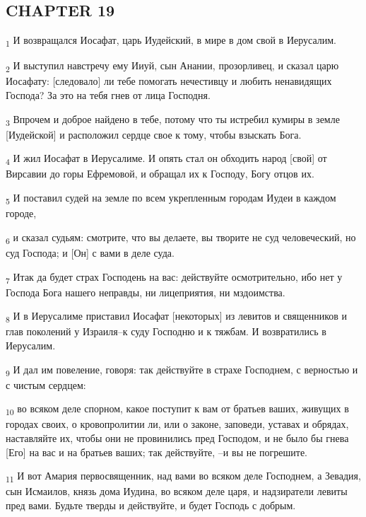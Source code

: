 \subsection{CHAPTER 19}
\begin{tcolorbox}
\textsubscript{1} И возвращался Иосафат, царь Иудейский, в мире в дом свой в Иерусалим.
\end{tcolorbox}
\begin{tcolorbox}
\textsubscript{2} И выступил навстречу ему Ииуй, сын Анании, прозорливец, и сказал царю Иосафату: [следовало] ли тебе помогать нечестивцу и любить ненавидящих Господа? За это на тебя гнев от лица Господня.
\end{tcolorbox}
\begin{tcolorbox}
\textsubscript{3} Впрочем и доброе найдено в тебе, потому что ты истребил кумиры в земле [Иудейской] и расположил сердце свое к тому, чтобы взыскать Бога.
\end{tcolorbox}
\begin{tcolorbox}
\textsubscript{4} И жил Иосафат в Иерусалиме. И опять стал он обходить народ [свой] от Вирсавии до горы Ефремовой, и обращал их к Господу, Богу отцов их.
\end{tcolorbox}
\begin{tcolorbox}
\textsubscript{5} И поставил судей на земле по всем укрепленным городам Иудеи в каждом городе,
\end{tcolorbox}
\begin{tcolorbox}
\textsubscript{6} и сказал судьям: смотрите, что вы делаете, вы творите не суд человеческий, но суд Господа; и [Он] с вами в деле суда.
\end{tcolorbox}
\begin{tcolorbox}
\textsubscript{7} Итак да будет страх Господень на вас: действуйте осмотрительно, ибо нет у Господа Бога нашего неправды, ни лицеприятия, ни мздоимства.
\end{tcolorbox}
\begin{tcolorbox}
\textsubscript{8} И в Иерусалиме приставил Иосафат [некоторых] из левитов и священников и глав поколений у Израиля--к суду Господню и к тяжбам. И возвратились в Иерусалим.
\end{tcolorbox}
\begin{tcolorbox}
\textsubscript{9} И дал им повеление, говоря: так действуйте в страхе Господнем, с верностью и с чистым сердцем:
\end{tcolorbox}
\begin{tcolorbox}
\textsubscript{10} во всяком деле спорном, какое поступит к вам от братьев ваших, живущих в городах своих, о кровопролитии ли, или о законе, заповеди, уставах и обрядах, наставляйте их, чтобы они не провинились пред Господом, и не было бы гнева [Его] на вас и на братьев ваших; так действуйте, --и вы не погрешите.
\end{tcolorbox}
\begin{tcolorbox}
\textsubscript{11} И вот Амария первосвященник, над вами во всяком деле Господнем, а Зевадия, сын Исмаилов, князь дома Иудина, во всяком деле царя, и надзиратели левиты пред вами. Будьте тверды и действуйте, и будет Господь с добрым.
\end{tcolorbox}
